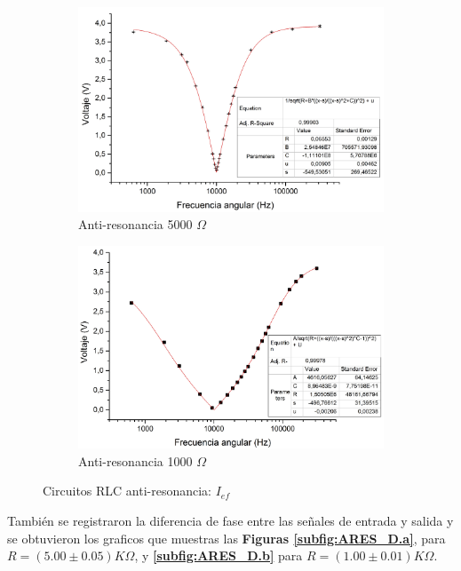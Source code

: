 \documentclass[11pt,a4paper]{article}
\begin{document}
\begin{figure}[h!]

\begin{subfigure}{0.5\textwidth}
\includegraphics[scale=0.31]{RLC_ARES_5000_VvsF}
  \caption{Anti-resonancia 5000 $\Omega$}
  \label{subfig:ARES_I.a}
\end{subfigure}
\begin{subfigure}{0.5\textwidth}
\includegraphics[scale=0.3]{RLC_ARES_1000_VvsF}
  \caption{Anti-resonancia 1000 $\Omega$}
  \label{subfig:ARES_I.b}
\end{subfigure}
  \caption{Circuitos RLC anti-resonancia: $I_{ef}$}
  \label{fig:ARES_I}
\end{figure}


También se registraron la diferencia de fase entre las señales de entrada y salida y se obtuvieron los graficos que muestras las \textbf{Figuras \ref{subfig:ARES_D.a}}, para $R=(5.00 \pm 0.05)K\Omega$, y \textbf{\ref{subfig:ARES_D.b}} para $R=(1.00 \pm 0.01)K\Omega$.
\end{document}
